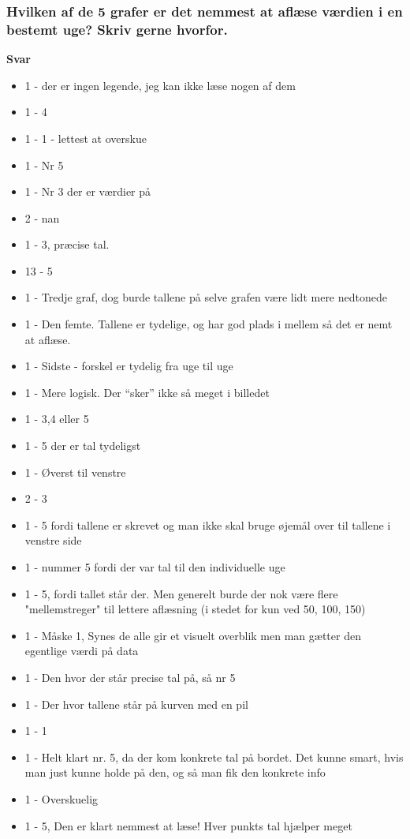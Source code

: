 \subsubsection{Hvilken af de 5 grafer er det nemmest at aflæse værdien i en bestemt uge? Skriv gerne hvorfor.}
\textbf{Svar}
\begin{itemize}
    \item 1 - der er ingen legende, jeg kan ikke læse nogen af dem
    \item 1 - 4
    \item 1 - 1 - lettest at overskue
    \item 1 - Nr 5
    \item 1 - Nr 3 der er værdier på
    \item 2 - nan
    \item 1 - 3, præcise tal.
    \item 13 - 5
    \item 1 - Tredje graf, dog burde tallene på selve grafen være lidt mere nedtonede
    \item 1 - Den femte. Tallene er tydelige, og har god plads i mellem så det er nemt at aflæse.
    \item 1 - Sidste - forskel er tydelig fra uge til uge
    \item 1 - Mere logisk. Der “sker” ikke så meget i billedet
    \item 1 - 3,4 eller 5
    \item 1 - 5 der er tal tydeligst
    \item 1 - Øverst til venstre
    \item 2 - 3
    \item 1 - 5 fordi tallene er skrevet og man ikke skal bruge øjemål over til tallene i venstre side
    \item 1 - nummer 5 fordi der var tal til den individuelle uge
    \item 1 - 5, fordi tallet står der. Men generelt burde der nok være flere "mellemstreger" til lettere aflæsning (i stedet for kun ved 50, 100, 150)
    \item 1 - Måske 1, Synes de alle gir et visuelt overblik men man gætter den egentlige værdi på data
    \item 1 - Den hvor der står precise tal på, så nr 5
    \item 1 - Der hvor tallene står på kurven med en pil
    \item 1 - 1
    \item 1 - Helt klart nr. 5, da der kom konkrete tal på bordet. Det kunne smart, hvis man just kunne holde på den, og så man fik den konkrete info
    \item 1 - Overskuelig
    \item 1 - 5, Den er klart nemmest at læse! Hver punkts tal hjælper meget
\end{itemize}

